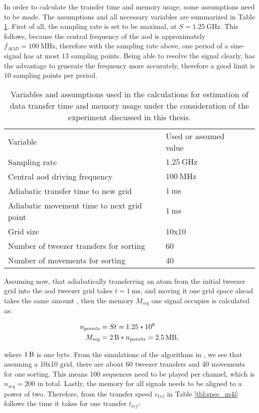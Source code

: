 In order to calculate the transfer time and memory usage, some assumptions need to be made. The assumptions and all necessary variables are summarized in Table \ref{tbl:spectrum_assumptions}. First of all, the sampling rate is set to be maximal, at $S=\SI{1.25}{\giga\hertz}$. This follows, because the central frequency of the \ac{aod} is approximately $f_{AOD}=\SI{100}{\mega\hertz}$, therefore with the sampling rate above, one period of a sine-signal has at most $13$ sampling points. Being able to resolve the signal clearly, has the advantage to generate the frequency more accurately, therefore a good limit is $10$ sampling points per period.

\begin{table}[tb]
\label{tbl:spectrum_assumptions}
\centering
\begin{tabular}{l|l|l}
	\hline \hline
	Variable & Used or assumed value \\ \thickhline
	Sampling rate & $\SI{1.25}{\giga\hertz}$ \\
	Central \ac{aod} driving frequency & $\SI{100}{\mega\hertz}$ \\
	Adiabatic transfer time to new grid & $\SI{1}{\milli\second}$ \\
	Adiabatic movement time to next grid point & $\SI{1}{\milli\second}$ \\
	Grid size & 10x10 \\
	Number of tweezer transfers for sorting & 60 \\
	Number of movements for sorting & 40 \\
	\hline \hline
\end{tabular}
\caption{Variables and assumptions used in the calculations for estimation of data transfer time and memory usage under the consideration of the experiment discussed in this thesis.}
\end{table}

Assuming now, that adiabatically transferring an atom from the initial tweezer grid into the \ac{aod} tweezer grid takes $t=\SI{1}{\milli\second}$, and moving it one grid space ahead takes the same amount , then the memory $M_{sig}$ one signal occupies is calculated as:

\begin{align}
	n_{points} &= S t = 1.25 * 10^6 \\
	M_{sig} &= \SI{2}{\byte} * n_{points} = \SI{2.5}{\mega\byte},
\end{align}

where $\SI{1}{\byte}$ is one byte. From the simulations of the algorithms in , we see that assuming a 10x10 grid, there are about 60 tweezer transfers and 40 movements for one sorting. This means 100 sequences need to be played per channel, which is $n_{seq}=200$ in total. Lastly, the memory for all signals needs to be aligned to a power of two. Therefore, from the transfer speed $v_{trf}$ in Table \ref{tbl:spec_m4i} follows the time it takes for one transfer $t_{trf}$:

